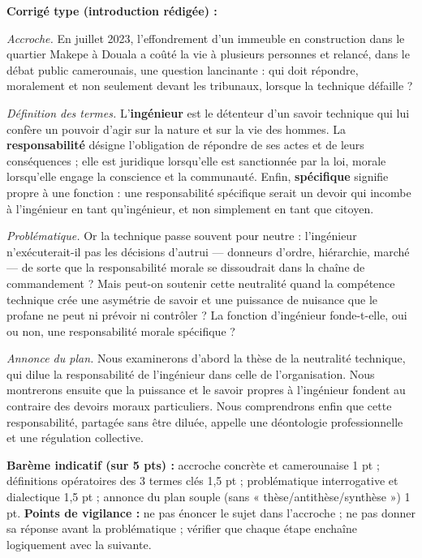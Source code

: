\documentclass[11pt]{article}
\begin{document}
\begin{corrige}
\textbf{Corrigé type (introduction rédigée) :}\par
\emph{Accroche.} En juillet 2023, l'effondrement d'un immeuble en construction dans le quartier Makepe à Douala a coûté la vie à plusieurs personnes et relancé, dans le débat public camerounais, une question lancinante : qui doit répondre, moralement et non seulement devant les tribunaux, lorsque la technique défaille ?\par
\emph{Définition des termes.} L'\textbf{ingénieur} est le détenteur d'un savoir technique qui lui confère un pouvoir d'agir sur la nature et sur la vie des hommes. La \textbf{responsabilité} désigne l'obligation de répondre de ses actes et de leurs conséquences ; elle est juridique lorsqu'elle est sanctionnée par la loi, morale lorsqu'elle engage la conscience et la communauté. Enfin, \textbf{spécifique} signifie propre à une fonction : une responsabilité spécifique serait un devoir qui incombe à l'ingénieur en tant qu'ingénieur, et non simplement en tant que citoyen.\par
\emph{Problématique.} Or la technique passe souvent pour neutre : l'ingénieur n'exécuterait-il pas les décisions d'autrui — donneurs d'ordre, hiérarchie, marché — de sorte que la responsabilité morale se dissoudrait dans la chaîne de commandement ? Mais peut-on soutenir cette neutralité quand la compétence technique crée une asymétrie de savoir et une puissance de nuisance que le profane ne peut ni prévoir ni contrôler ? La fonction d'ingénieur fonde-t-elle, oui ou non, une responsabilité morale spécifique ?\par
\emph{Annonce du plan.} Nous examinerons d'abord la thèse de la neutralité technique, qui dilue la responsabilité de l'ingénieur dans celle de l'organisation. Nous montrerons ensuite que la puissance et le savoir propres à l'ingénieur fondent au contraire des devoirs moraux particuliers. Nous comprendrons enfin que cette responsabilité, partagée sans être diluée, appelle une déontologie professionnelle et une régulation collective.\par
\textbf{Barème indicatif (sur 5 pts) :} accroche concrète et camerounaise 1 pt ; définitions opératoires des 3 termes clés 1,5 pt ; problématique interrogative et dialectique 1,5 pt ; annonce du plan souple (sans « thèse/antithèse/synthèse ») 1 pt.
\textbf{Points de vigilance :} ne pas énoncer le sujet dans l'accroche ; ne pas donner sa réponse avant la problématique ; vérifier que chaque étape enchaîne logiquement avec la suivante.
\end{corrige}
\end{document}

